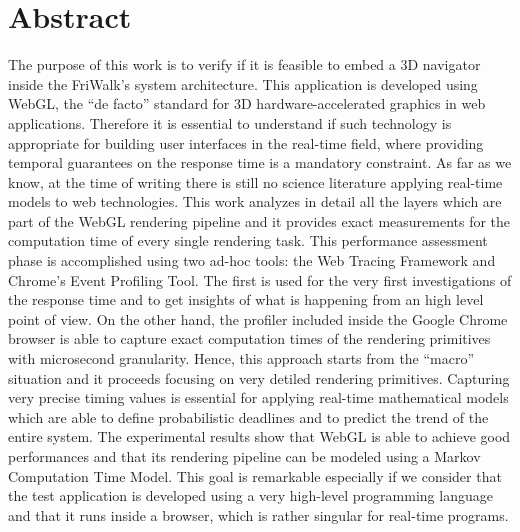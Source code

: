 \chapter*{Abstract} \label{abstract} %

The purpose of this work is to verify if it is feasible to embed a 3D navigator
inside the FriWalk's system architecture. This application is developed using
WebGL, the ``de facto'' standard for 3D hardware-accelerated graphics in
web applications. Therefore it is essential to understand if such technology
is appropriate for building user interfaces in the real-time field, where
providing temporal guarantees on the response time is a mandatory constraint.
As far as we know, at the time of writing there is still no science literature
applying real-time models to web technologies.
%
This work analyzes in detail all the layers which are part of the WebGL
rendering pipeline and it provides exact measurements for the computation time
of every single rendering task.
This performance assessment phase is accomplished using two ad-hoc tools: the
Web Tracing Framework and Chrome's Event Profiling Tool.
The first is used for the very first investigations of the response time and to
get insights of what is happening from an high level point of view.
On the other hand, the profiler included inside the Google Chrome browser is
able to capture exact computation times of the rendering primitives with microsecond
granularity. Hence, this approach starts from the ``macro'' situation and it
proceeds focusing on very detiled rendering primitives.
%
Capturing very precise timing values is essential for applying real-time
mathematical models which are able to define probabilistic deadlines and to predict
the trend of the entire system.
%
The experimental results show that WebGL is able to achieve good performances
and that its rendering pipeline can be modeled using a Markov Computation Time
Model.
This goal is remarkable especially if we consider that the test application is
developed using a very high-level programming language and that it runs inside
a browser, which is rather singular for real-time programs.
